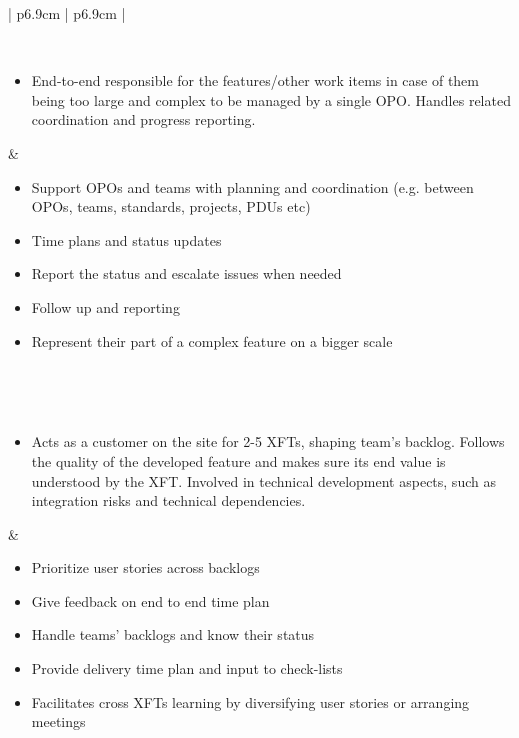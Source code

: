 \begin{table}[h]
   \begin{tabularx}{\textwidth}{ | p{6.9cm} | p{6.9cm} | }
   
   \hline
   
   
   \\ \hline
   
   \begin{itemize}[label={}, leftmargin=*, topsep=0pt, itemsep=0pt, partopsep=0pt]
     \item End-to-end responsible for the features/other work items in case of them being too large and complex to be managed by a single OPO. Handles related coordination and progress reporting. 
   \end{itemize} & 

   \begin{itemize}[label={}, leftmargin=*, topsep=0pt, itemsep=0pt, partopsep=0pt]
     \item Support OPOs and teams with planning and coordination (e.g. between OPOs, teams, standards, projects, PDUs etc)
     \item Time plans and status updates
     \item Report the status and escalate issues when needed
     \item Follow up and reporting
     \item Represent their part of a complex feature on a bigger scale 
   \end{itemize} 
   
   \\ \hline
   
   \hline
   
   \\ \hline
   
   \begin{itemize}[label={}, leftmargin=*, topsep=0pt, itemsep=0pt, partopsep=0pt]
     \item Acts as a customer on the site for 2-5 XFTs, shaping team's backlog. Follows the quality of the developed feature and makes sure its end value is understood by the XFT. Involved in technical development aspects, such as integration risks and technical dependencies.
   \end{itemize} & 
   
   \begin{itemize}[label={}, leftmargin=*, topsep=0pt, itemsep=0pt, partopsep=0pt]
     \item Prioritize user stories across backlogs
     \item Give feedback on end to end time plan
     \item Handle teams' backlogs and know their status
     \item Provide delivery time plan and input to check-lists
     \item Facilitates cross XFTs learning by diversifying user stories or arranging meetings 
   \end{itemize} 
   

\end{tabularx}
\end{table}

